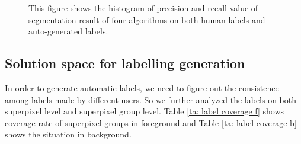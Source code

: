 \documentclass[runningheads,a4paper]{llncs}
\begin{document}
\begin{figure}[!tb]

\caption{ This figure shows the histogram of precision and recall value of segmentation result of four algorithms on both human labels and auto-generated labels.}
\label{fig:pr-human-simu}
\end{figure}


\subsection{Solution space for labelling generation}
In order to generate automatic labels, we need to figure out the consistence among labels made by different users. So we further analyzed the labels on both superpixel level and superpixel group level. Table \ref{ta: label coverage f} shows coverage rate of superpixel groups in foreground and Table \ref{ta: label coverage b} shows the situation in background.
\end{document}
